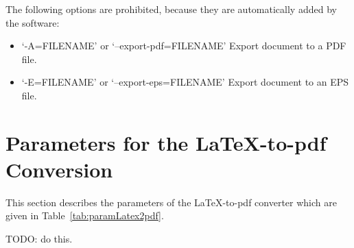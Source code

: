 \noindent
The following options are prohibited, 
because they are automatically added by the software: 
\begin{itemize}
\item `-A=FILENAME' or `--export-pdf=FILENAME' 
Export document to a  PDF file. 
\item `-E=FILENAME' or `--export-eps=FILENAME' 
Export document to an EPS file. 		 
\end{itemize}


\section{Parameters for the \LaTeX-to-pdf Conversion}
\label{sec:settingsLatex2pdf}

This section describes the parameters 
of the \LaTeX-to-pdf converter 
which are given in Table~\ref{tab:paramLatex2pdf}. 

TODO\@: do this. 


